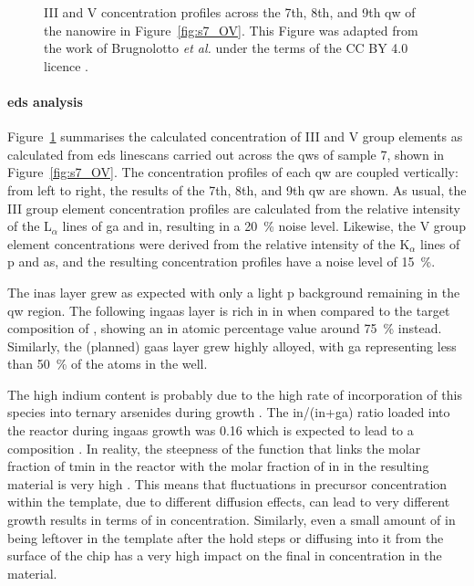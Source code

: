 \begin{figure}
{
    }
    \caption[III and V concentration profiles across the 7th, 8th, and 9th \acl{qw} of the nanowire cross section cut from sample 7.]{ III and  V concentration profiles across the 7th, 8th, and 9th \acl{qw} of the nanowire in Figure~\ref{fig:s7_OV}. This Figure was adapted from the work of Brugnolotto \textit{et al.} \cite{Brugnolotto2023_2} under the terms of the CC BY 4.0 licence \cite{CCBY40}.}
    \label{fig:s7_EDS}
\end{figure}

\paragraph{\acs{eds} analysis} Figure~\ref{fig:s7_EDS} summarises the calculated concentration of III and V group elements as calculated from \acs{eds} linescans carried out across the \acl{qw}s of sample 7, shown in Figure~\ref{fig:s7_OV}. The concentration profiles of each \acl{qw} are coupled vertically: from left to right, the results of the 7th, 8th, and 9th \acl{qw} are shown. As usual, the III group element concentration profiles are calculated from the relative intensity of the L\(_\alpha\) lines of \acl{ga} and \acs{in}, resulting in a \qty{20}{\%} noise level. Likewise, the V group element concentrations were derived from the relative intensity of the K\(_\alpha\) lines of \acl{p} and \acl{as}, and the resulting concentration profiles have a noise level of \qty{15}{\%}.

The \acs{inas} layer grew as expected with only a light \acl{p} background remaining in the \acl{qw} region. The following \acs{ingaas} layer is rich in \acl{in} when compared to the target composition of , showing an \acl{in} atomic percentage value around \qty{75}{\%} instead. Similarly, the (planned) \acs{gaas} layer grew highly alloyed, with \acl{ga} representing less than \qty{50}{\%} of the atoms in the well. 

The high indium content is probably due to the high rate of incorporation of this species into ternary arsenides during  growth \cite{Borg2019}. The \acs{in}/(\acs{in}+\acs{ga}) ratio loaded into the reactor during \acs{ingaas} growth was \num{0.16} which is expected to lead to a  composition \cite{Borg2019}. In reality, the steepness of the function that links the molar fraction of \acf{tmin} in the reactor with the molar fraction of \acl{in} in the resulting material is very high \cite{Borg2019}. This means that fluctuations in precursor concentration within the template, due to different diffusion effects, can lead to very different growth results in terms of \acl{in} concentration. Similarly, even a small amount of \acl{in} being leftover in the template after the hold steps or diffusing into it from the surface of the chip has a very high impact on the final \acl{in} concentration in the material. 

